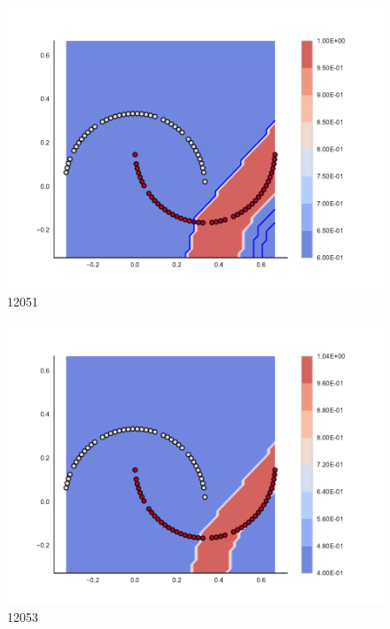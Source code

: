 \begin{subfigure}[b]{0.09\textwidth}
    \includegraphics[clip, trim=2.35cm 1.75cm 4.5cm 0cm,width=\textwidth]{img/convergence/12051.pdf}
    \caption{12051}
    \label{fig:convergence_12051}
\end{subfigure}
%
\begin{subfigure}[b]{0.09\textwidth}
    \includegraphics[clip, trim=2.35cm 1.75cm 4.5cm 0cm,width=\textwidth]{img/convergence/12053.pdf}
    \caption{12053}
    \label{fig:convergence_12053}
\end{subfigure}
%
